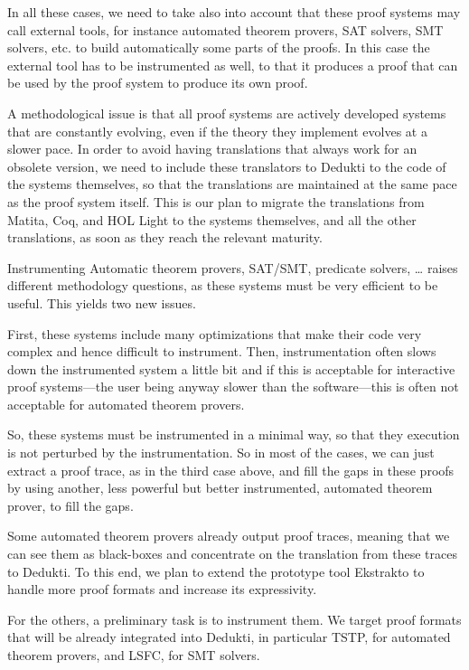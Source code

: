 In all these cases, we need to take also into account that these proof
systems may call external tools, for instance automated theorem
provers, SAT solvers, SMT solvers, etc. to build automatically some
parts of the proofs. In this case the external tool has to be
instrumented as well, to that it produces a proof that can be used by
the proof system to produce its own proof.

A methodological issue is that all proof systems are actively
developed systems that are constantly evolving, even if the theory
they implement evolves at a slower pace. In order to avoid having
translations that always work for an obsolete version, we need to
include these translators to Dedukti to the code of the systems
themselves, so that the translations are maintained at the same pace
as the proof system itself. This is our plan to migrate the
translations from Matita, Coq, and HOL Light to the systems
themselves, and all the other translations, as soon as they reach the
relevant maturity.


Instrumenting Automatic theorem provers, SAT/SMT, predicate solvers,
\dots
raises different methodology questions, as these systems
must be very efficient to be useful. This yields two new issues.

First, these systems include many optimizations that make their code
very complex and hence difficult to instrument. Then, instrumentation
often slows down the instrumented system a little bit and if this is
acceptable for interactive proof systems---the user being anyway
slower than the software---this is often not acceptable for automated
theorem provers.

So, these systems must be instrumented in a minimal way, so that they
execution is not perturbed by the instrumentation. So in most of the
cases, we can just extract a proof trace, as in the third case above,
and fill the gaps in these proofs by using another, less powerful but better
instrumented, automated theorem prover, to fill the gaps. 

Some automated theorem provers already output proof traces, meaning
that we can see them as black-boxes and concentrate on the translation
from these traces to Dedukti. To this end, we plan to extend the
prototype tool Ekstrakto to handle more proof formats and increase its
expressivity.

For the others, a preliminary task is to instrument them.  We target
proof formats that will be already integrated into Dedukti, in
particular TSTP, for automated theorem provers, and LSFC, for SMT solvers.

